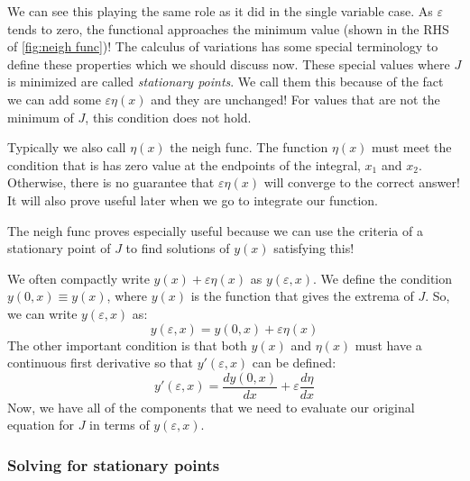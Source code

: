 We can see this playing the same role as it did in the single variable case. As $\varepsilon$ tends to zero, the functional approaches the minimum value (shown in the RHS of \autoref{fig:neigh func})! The calculus of variations has some special terminology to define these properties which we should discuss now. These special values where $J$ is minimized are called \textit{stationary points}. We call them this because of the fact we can add some $\varepsilon\eta(x)$ and they are unchanged! For values that are not the minimum of $J$, this condition does not hold.

Typically we also call $\eta(x)$ the \gls{neigh func}. The function $\eta(x)$ must meet the condition that is has zero value at the endpoints of the integral, $x_1$ and $x_2$. Otherwise, there is no guarantee that $\varepsilon\eta(x)$ will converge to the correct answer! It will also prove useful later when we go to integrate our function.

The \gls{neigh func} proves especially useful because we can use the criteria of a stationary point of $J$ to find solutions of $y(x)$ satisfying this!

We often compactly write $y(x)+\varepsilon\eta(x)$ as $y(\varepsilon,x)$. We define the condition $y(0,x)\equiv y(x)$, where $y(x)$ is the function that gives the extrema of $J$. So, we can write $y(\varepsilon,x)$ as:
\begin{equation}\label{eq:y epsilon}
    y(\varepsilon,x)=y(0,x)+\varepsilon\eta(x)
\end{equation}
The other important condition is that both $y(x)$ and $\eta(x)$ must have a continuous first derivative so that $y'(\varepsilon,x)$ can be defined:
\begin{equation}\label{eq:y prime epsilon}
    y'(\varepsilon,x)=\frac{dy(0,x)}{dx}+\varepsilon\frac{d\eta}{dx}
\end{equation}
Now, we have all of the components that we need to evaluate our original equation for $J$ in terms of $y(\varepsilon,x)$.

\subsubsection{Solving for stationary points}

